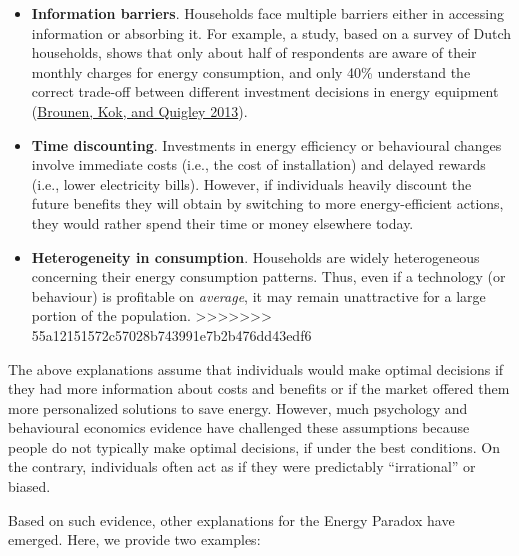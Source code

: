 \documentclass[
  12pt,
  captions=heading]{scrreport}
\begin{document}
\begin{keypoints}
\begin{itemize}
=======
\item
  \textbf{Information barriers}. Households face multiple barriers
  either in accessing information or absorbing it. For example, a study,
  based on a survey of Dutch households, shows that only about half of
  respondents are aware of their monthly charges for energy consumption,
  and only 40\% understand the correct trade-off between different
  investment decisions in energy equipment
  (\protect\hyperlink{ref-brounen2013energy}{Brounen, Kok, and Quigley
  2013}).
\item
  \textbf{Time discounting}. Investments in energy efficiency or
  behavioural changes involve immediate costs (i.e., the cost of
  installation) and delayed rewards (i.e., lower electricity bills).
  However, if individuals heavily discount the future benefits they will
  obtain by switching to more energy-efficient actions, they would
  rather spend their time or money elsewhere today.
\item
  \textbf{Heterogeneity in consumption}. Households are widely
  heterogeneous concerning their energy consumption patterns. Thus, even
  if a technology (or behaviour) is profitable on \emph{average}, it may
  remain unattractive for a large portion of the population.
>>>>>>> 55a12151572c57028b743991e7b2b476dd43edf6
\end{itemize}
\end{keypoints}

The above explanations assume that individuals would make optimal
decisions if they had more information about costs and benefits or if
the market offered them more personalized solutions to save energy.
However, much psychology and behavioural economics evidence have
challenged these assumptions because people do not typically make
optimal decisions, if under the best conditions. On the contrary,
individuals often act as if they were predictably ``irrational'' or
biased.

Based on such evidence, other explanations for the Energy Paradox have
emerged. Here, we provide two examples:
\end{document}
